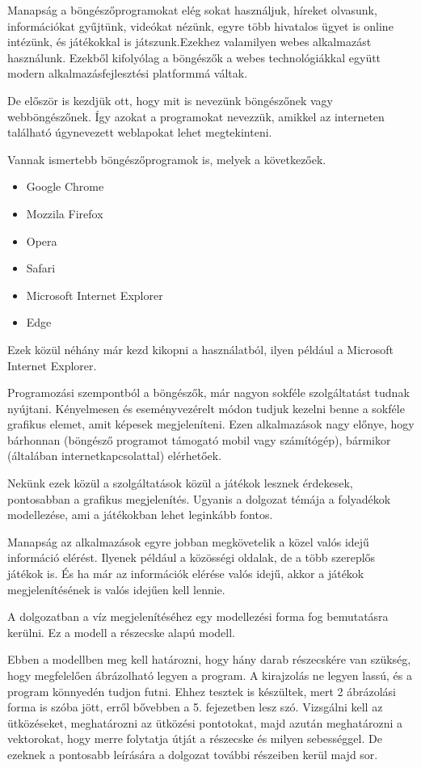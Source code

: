 
Manapság a böngészőprogramokat elég sokat használjuk, híreket olvasunk, információkat gyűjtünk, videókat nézünk, egyre több hivatalos ügyet is online intézünk, és játékokkal is játszunk.Ezekhez valamilyen webes alkalmazást használunk. Ezekből kifolyólag a böngészők a webes technológiákkal együtt modern alkalmazásfejlesztési platformmá váltak.


De először is kezdjük ott, hogy mit is nevezünk böngészőnek vagy webböngészőnek. Így azokat a programokat nevezzük, amikkel az interneten található úgynevezett weblapokat lehet megtekinteni. 

Vannak ismertebb böngészőprogramok is, melyek a következőek.

\begin{itemize}
	\item Google Chrome
	\item Mozzila Firefox
	\item Opera
	\item Safari
	\item Microsoft Internet Explorer
	\item Edge
\end{itemize}

Ezek közül néhány már kezd kikopni a használatból, ilyen például a Microsoft Internet Explorer. 
 

Programozási szempontból a böngészők, már nagyon sokféle szolgáltatást tudnak nyújtani. Kényelmesen és eseményvezérelt módon tudjuk kezelni benne a sokféle grafikus elemet, amit képesek megjeleníteni. Ezen alkalmazások nagy előnye, hogy bárhonnan (böngésző programot támogató mobil vagy számítógép), bármikor (általában internetkapcsolattal) elérhetőek. 

Nekünk ezek közül a szolgáltatások közül a játékok lesznek érdekesek, pontosabban a grafikus megjelenítés. Ugyanis a dolgozat témája a folyadékok modellezése, ami a játékokban lehet leginkább fontos.  

Manapság az alkalmazások egyre jobban megkövetelik a közel valós idejű információ elérést. Ilyenek például a közösségi oldalak, de a több szereplős játékok is. És ha már az információk elérése valós idejű, akkor a játékok megjelenítésének is valós idejűen kell lennie.

A dolgozatban a víz megjelenítéséhez egy modellezési forma fog bemutatásra kerülni. Ez a modell a részecske alapú modell.


Ebben a modellben meg kell határozni, hogy hány darab részecskére van szükség, hogy megfelelően ábrázolható legyen a program. A kirajzolás ne legyen lassú, és a program könnyedén tudjon futni. Ehhez tesztek is készültek, mert 2 ábrázolási forma is szóba jött, erről bővebben a 5. fejezetben lesz szó. Vizsgálni kell az ütközéseket, meghatározni az ütközési pontotokat, majd azután meghatározni a vektorokat, hogy merre folytatja útját a részecske és milyen sebességgel. De ezeknek a pontosabb leírására a dolgozat további részeiben kerül majd sor. 



